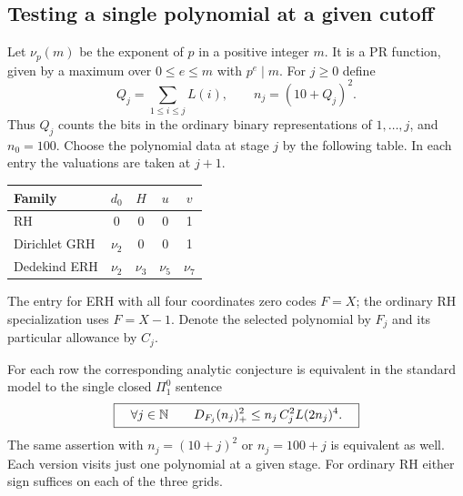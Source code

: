 \subsection*{Testing a single polynomial at a given cutoff}
Let $\nu_p(m)$ be the exponent of $p$ in a positive integer $m$. It is a PR function, given by a maximum over $0\le e\le m$ with $p^e\mid m$. For $j\ge0$ define
\[
 Q_j=\sum_{1\le i\le j} L(i),\qquad n_j=(10+Q_j)^2.
\]
Thus $Q_j$ counts the bits in the ordinary binary representations of $1,\ldots,j$, and $n_0=100$. Choose the polynomial data at stage $j$ by the following table. In each entry the valuations are taken at $j+1$.
\begin{center}
\begin{tabular}{@{}lcccc@{}}\toprule
Family &$d_0$&$H$&$u$&$v$\\\midrule
RH&0&0&0&1\\
Dirichlet GRH&$\nu_2$&0&0&1\\
Dedekind ERH&$\nu_2$&$\nu_3$&$\nu_5$&$\nu_7$\\\bottomrule
\end{tabular}
\end{center}
The entry for ERH with all four coordinates zero codes $F=X$; the ordinary RH specialization uses $F=X-1$. Denote the selected polynomial by $F_j$ and its particular allowance by $C_j$.
\begin{theorem}\label{thm:rotate}
For each row the corresponding analytic conjecture is equivalent in the standard model to the single closed $\Pi^0_1$ sentence
\begin{equation}\label{eq:rotating}
 \boxed{\quad\forall j\in\mathbb N\qquad D_{F_j}(n_j)_+^2\le n_j\,C_j^2 L(2n_j)^4.\quad}
\end{equation}
The same assertion with $n_j=(10+j)^2$ or $n_j=100+j$ is equivalent as well. Each version visits just one polynomial at a given stage. For ordinary RH either sign suffices on each of the three grids.
\end{theorem}
